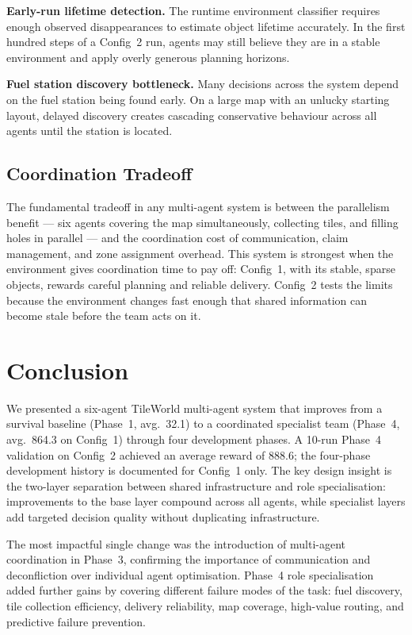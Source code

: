 \documentclass[letterpaper]{article}
\begin{document}
\textbf{Early-run lifetime detection.} The runtime environment classifier
requires enough observed disappearances to estimate object lifetime accurately.
In the first hundred steps of a Config~2 run, agents may still believe they
are in a stable environment and apply overly generous planning horizons.

\textbf{Fuel station discovery bottleneck.} Many decisions across the system
depend on the fuel station being found early. On a large map with an unlucky
starting layout, delayed discovery creates cascading conservative behaviour
across all agents until the station is located.

\subsection{Coordination Tradeoff}

The fundamental tradeoff in any multi-agent system is between the parallelism
benefit --- six agents covering the map simultaneously, collecting tiles, and
filling holes in parallel --- and the coordination cost of communication,
claim management, and zone assignment overhead. This system is strongest when
the environment gives coordination time to pay off: Config~1, with its stable,
sparse objects, rewards careful planning and reliable delivery. Config~2 tests
the limits because the environment changes fast enough that shared information
can become stale before the team acts on it.

\section{Conclusion}

We presented a six-agent TileWorld multi-agent system that improves from a
survival baseline (Phase~1, avg.\ 32.1) to a coordinated specialist team
(Phase~4, avg.\ 864.3 on Config~1) through four development phases.
A 10-run Phase~4 validation on Config~2 achieved an average reward of 888.6;
the four-phase development history is documented for Config~1 only. The key design insight is the two-layer separation between shared
infrastructure and role specialisation: improvements to the base layer compound
across all agents, while specialist layers add targeted decision quality without
duplicating infrastructure.

The most impactful single change was the introduction of multi-agent
coordination in Phase~3, confirming the importance of communication and
deconfliction over individual agent optimisation. Phase~4 role specialisation
added further gains by covering different failure modes of the task: fuel
discovery, tile collection efficiency, delivery reliability, map coverage,
high-value routing, and predictive failure prevention.
\end{document}
